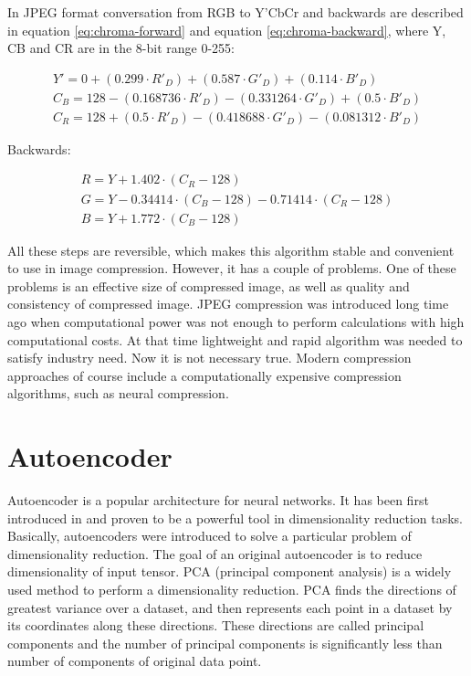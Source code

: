 In JPEG format conversation from RGB to Y'CbCr and backwards are described in equation \ref{eq:chroma-forward} and equation \ref{eq:chroma-backward}, where Y, CB and CR are in the 8-bit range 0-255:

\begin{equation}
    \label{eq:chroma-forward}
    \begin{split}
        Y'=0+(0.299\cdot R'_{D})+(0.587\cdot G'_{D})+(0.114\cdot B'_{D}) \\
        C_{B}=128-(0.168736\cdot R'_{D})-(0.331264\cdot G'_{D})+(0.5\cdot B'_{D}) \\
        C_{R}=128+(0.5\cdot R'_{D})-(0.418688\cdot G'_{D})-(0.081312\cdot B'_{D})
    \end{split}
\end{equation}

Backwards:

\begin{equation}
    \label{eq:chroma-backward}
    \begin{split}
        R=Y+1.402\cdot (C_{R}-128) \\
        G=Y-0.34414\cdot (C_{B}-128)-0.71414\cdot (C_{R}-128) \\
        B=Y+1.772\cdot (C_{B}-128)
    \end{split}
\end{equation}

All these steps are reversible, which makes this algorithm stable and convenient to use in image compression. However, it has a couple of problems. One of these problems is an effective size of compressed image, as well as quality and consistency of compressed image. JPEG compression was introduced long time ago when computational power was not enough to perform calculations with high computational costs. At that time lightweight and rapid algorithm was needed to satisfy industry need. Now it is not necessary true. Modern compression approaches of course include a computationally expensive compression algorithms, such as neural compression.

\section{Autoencoder}

Autoencoder is a popular architecture for neural networks. It has been first introduced in \cite{Autoencoder_2006} and proven to be a powerful tool in dimensionality reduction tasks. Basically, autoencoders were introduced to solve a particular problem of dimensionality reduction. The goal of an original autoencoder is to reduce dimensionality of input tensor. PCA (principal component analysis) is a widely used method to perform a dimensionality reduction. PCA finds the directions of greatest variance over a dataset, and then represents each point in a dataset by its coordinates along these directions. These directions are called principal components and the number of principal components is significantly less than number of components of original data point.

